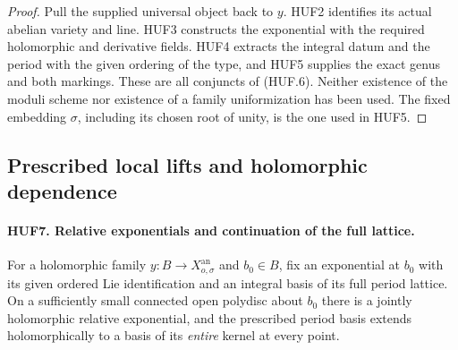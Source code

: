 \documentclass[11pt,a4paper]{article}
\numberwithin{equation}{section}
\theoremstyle{remark}\newtheorem{remark}[theorem]{Remark}
\begin{document}
\begin{proof}
Pull the supplied universal object back to \(y\).
HUF2 identifies its actual abelian variety and line.
HUF3 constructs the exponential with the required
holomorphic and derivative fields.
HUF4 extracts the integral datum and the period with the
given ordering of the type, and HUF5 supplies the exact
genus and both markings.  These are all conjuncts of
(HUF.6).  Neither existence of the moduli scheme nor
existence of a family uniformization has been used.
The fixed embedding \(\sigma\), including its chosen
root of unity, is the one used in HUF5.
\end{proof}

\subsection{Prescribed local lifts and holomorphic dependence}

\paragraph{HUF7. Relative exponentials and continuation of the full lattice.}
\label{claim:HUF7}
For a holomorphic family \(y:B\to X_{o,\sigma}^{\mathrm{an}}\)
and \(b_0\in B\), fix an exponential at \(b_0\) with its
given ordered Lie identification and an integral basis
of its full period lattice.  On a sufficiently small
connected open polydisc about \(b_0\) there is a jointly
holomorphic relative exponential, and the prescribed
period basis extends holomorphically to a basis of its
\emph{entire} kernel at every point.
\end{document}
